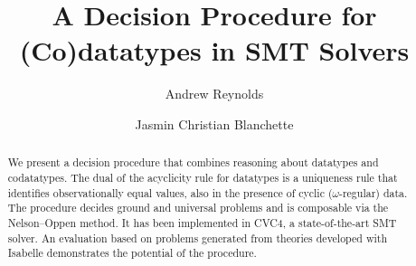 
\global\def\figurename{Figure}
\global\def\figuresname{Figures}


\makeatletter
\ps@myheadings
\makeatother







\title{A Decision Procedure for (Co)datatypes in SMT Solvers}

\author {Andrew Reynolds \and Jasmin Christian Blanchette}

\maketitle

\smallskipamount

\begin{nomemoriam}
\noindent\hfill\emph{\phantom{In memoriam Morgan Deters 1979--2015}}

\vspace*{-6\smallskipamount}
\end{nomemoriam}
\begin{memoriam}
\noindent\hfill\emph{}
\end{memoriam}

\begin{abstract}
We present a decision procedure that combines reasoning about
datatypes and codatatypes. The dual of the acyclicity rule for datatypes is a
uniqueness rule that identifies observationally equal values, also in the presence of cyclic
($\omega$-regular) data. The procedure decides ground and universal
problems and is composable via the Nelson--Oppen method. It has been
implemented in CVC4, a state-of-the-art SMT solver. An evaluation based on
problems generated from theories developed with Isabelle demonstrates the
potential of the procedure.
\end{abstract}

